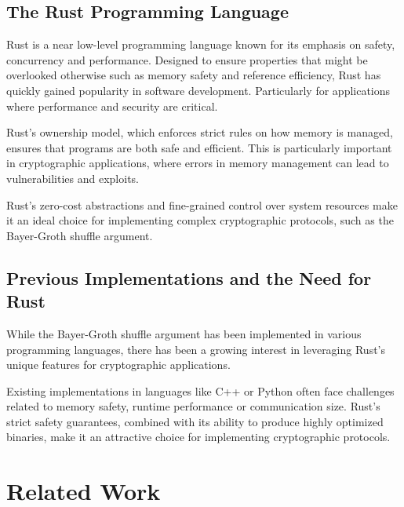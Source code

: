 \documentclass[12pt,a4paper]{report}
\begin{document}
\section{The Rust Programming Language}
Rust\cite{rust} is a near low-level programming language known for its emphasis on safety, concurrency and performance.
Designed to ensure properties that might be overlooked otherwise such as memory safety and
reference efficiency, Rust has quickly gained popularity in software development. 
Particularly for applications where performance and security are critical.\par
Rust's ownership model, which enforces strict rules on how memory is managed, ensures that programs
are both safe and efficient\cite{rust}. This is particularly important in cryptographic applications,
where errors in memory management can lead to vulnerabilities and exploits.\par
Rust's zero-cost abstractions and fine-grained control over system resources make it an ideal
choice for implementing complex cryptographic protocols, such as the Bayer-Groth shuffle argument.
\section{Previous Implementations and the Need for Rust}
While the Bayer-Groth shuffle argument has been implemented in various programming languages, 
there has been a growing interest in leveraging Rust’s unique features for cryptographic applications. \par
Existing implementations in languages like C++ or Python often face challenges related to memory safety, runtime performance or communication size.
Rust’s strict safety guarantees, combined with its ability to produce highly optimized binaries, make it an attractive choice for implementing cryptographic protocols.

\chapter{Related Work}
\end{document}
